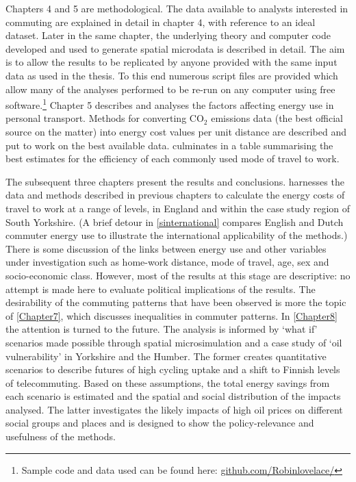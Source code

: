 Chapters 4 and 5 are methodological. The data available to analysts interested
in commuting are explained in detail in chapter 4, with reference to an ideal
dataset. Later in the same chapter, the underlying theory and computer code
developed and
used to generate spatial microdata is described in detail. The aim is to allow the
results to be replicated by anyone provided with the same input data as used in
the thesis. To this end numerous script files are provided which allow many
of the analyses performed to be re-run on any computer using free
software.\footnote{Sample code
and data used can be found here: {\color{blue}
\href{https://github.com/Robinlovelace/}
{github.com/Robinlovelace/}}
}
Chapter 5 describes and analyses the factors affecting energy use in personal
transport. Methods for converting CO$_2$ emissions data (the best official
source on the matter) into energy cost values per unit distance are described
and put to work on the best available data. 
culminates in a table summarising the best estimates for the
efficiency of each commonly used mode of travel to work.

The subsequent three chapters present the results and conclusions.
 harnesses the data and methods described in
previous chapters to
calculate the energy costs of travel to work at a range of levels, in England
and within the case study region of South Yorkshire. (A brief detour in
\cref{sinternational} compares English and Dutch commuter energy use
to illustrate the international applicability of the methods.) There is some discussion
of the links between energy use and other variables under investigation such as
home-work distance, mode of travel, age, sex and socio-economic class. However,
most of the results at this stage are descriptive: no
attempt is made here to evaluate political implications of the results. The
desirability of the commuting patterns that have been observed is more the
topic of \cref{Chapter7}, which discusses inequalities in commuter patterns.
In \cref{Chapter8} the attention is turned to the future. The analysis
is informed by `what if' scenarios made possible through spatial microsimulation
and a case study of `oil vulnerability' in Yorkshire and the
Humber.
The former creates quantitative scenarios to describe futures
of high cycling uptake and a shift to Finnish levels of telecommuting.
Based on these assumptions, the total energy savings from each scenario is
estimated and the spatial and social distribution of the impacts
analysed. 
The latter investigates the likely impacts of high oil prices on
different social groups and places and is designed to show the policy-relevance
and usefulness of the methods.

